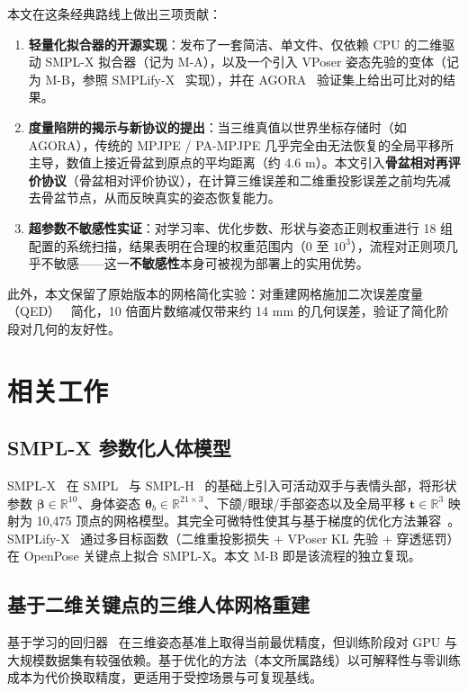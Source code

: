 \documentclass[a4paper,11pt]{article}
\newcommand{\prp}{骨盆相对评价协议}
\begin{document}
本文在这条经典路线上做出三项贡献：

\begin{enumerate}
  \item \textbf{轻量化拟合器的开源实现}：发布了一套简洁、单文件、仅依赖 CPU 的二维驱动 SMPL-X 拟合器（记为 M-A），以及一个引入 VPoser 姿态先验的变体（记为 M-B，参照 SMPLify-X~\cite{SMPLifyX} 实现），并在 AGORA~\cite{AGORA} 验证集上给出可比对的结果。
  \item \textbf{度量陷阱的揭示与新协议的提出}：当三维真值以世界坐标存储时（如 AGORA），传统的 MPJPE / PA-MPJPE 几乎完全由无法恢复的全局平移所主导，数值上接近骨盆到原点的平均距离（约 4.6 m）。本文引入\textbf{骨盆相对再评价协议}（\prp），在计算三维误差和二维重投影误差之前均先减去骨盆节点，从而反映真实的姿态恢复能力。
  \item \textbf{超参数不敏感性实证}：对学习率、优化步数、形状与姿态正则权重进行 18 组配置的系统扫描，结果表明在合理的权重范围内（$0$ 至 $10^{3}$），流程对正则项几乎不敏感——这一\textbf{不敏感性}本身可被视为部署上的实用优势。
\end{enumerate}

此外，本文保留了原始版本的网格简化实验：对重建网格施加二次误差度量（QED）~\cite{QED} 简化，10 倍面片数缩减仅带来约 14 mm 的几何误差，验证了简化阶段对几何的友好性。

\section{相关工作}
\label{sec:related}

\subsection{SMPL-X 参数化人体模型}
SMPL-X~\cite{SMPLX} 在 SMPL~\cite{SMPL} 与 SMPL-H~\cite{SMPLH} 的基础上引入可活动双手与表情头部，将形状参数 $\boldsymbol{\beta}\!\in\!\mathbb{R}^{10}$、身体姿态 $\boldsymbol{\theta}_b\!\in\!\mathbb{R}^{21\times 3}$、下颌/眼球/手部姿态以及全局平移 $\mathbf{t}\!\in\!\mathbb{R}^{3}$ 映射为 10{,}475 顶点的网格模型。其完全可微特性使其与基于梯度的优化方法兼容~\cite{Adam}。SMPLify-X~\cite{SMPLifyX} 通过多目标函数（二维重投影损失 + VPoser KL 先验 + 穿透惩罚）在 OpenPose 关键点上拟合 SMPL-X。本文 M-B 即是该流程的独立复现。

\subsection{基于二维关键点的三维人体网格重建}
基于学习的回归器~\cite{HMR,SPIN,ExPose,PIXIE} 在三维姿态基准上取得当前最优精度，但训练阶段对 GPU 与大规模数据集有较强依赖。基于优化的方法（本文所属路线）以可解释性与零训练成本为代价换取精度，更适用于受控场景与可复现基线。
\end{document}
